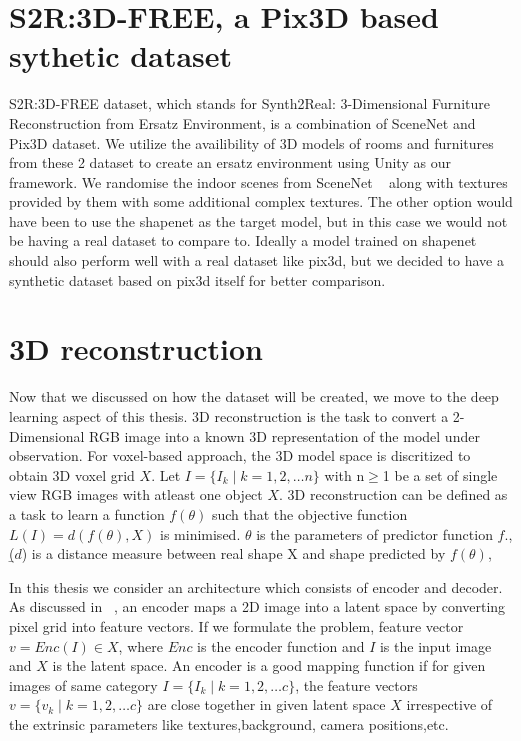 \section{S2R:3D-FREE, a Pix3D based sythetic dataset}\label{sec:s2r:3d-free-a-pix3d-based-sythetic-dataset}

S2R:3D-FREE dataset, which stands for Synth2Real: 3-Dimensional Furniture Reconstruction from Ersatz Environment, is a combination of SceneNet and Pix3D dataset.
We utilize the availibility of 3D models of rooms and furnitures from these 2 dataset to create an ersatz environment using Unity as our framework.
We randomise the indoor scenes from SceneNet ~\cite{McCormac:etal:ICCV2017} along with textures provided by them with some additional complex textures.
The other option would have been to use the shapenet as the target model, but in this case we would not be having a real dataset to compare to.
Ideally a model trained on shapenet should also perform well with a real dataset like pix3d, but we decided to have a synthetic dataset based on pix3d itself for better comparison.

\section{3D reconstruction}\label{sec:3D reconstruction}
Now that we discussed on how the dataset will be created, we move to the deep learning aspect of this thesis.
3D reconstruction is the task to convert a 2-Dimensional RGB image into a known 3D representation of the model under observation.
For voxel-based approach, the 3D model space is discritized to obtain 3D voxel grid $X$.
Let $I = \{I_k \mid k = 1,2,\dots n\}$ with n$\geq$1 be a set of single view RGB images with atleast one object $X$.
3D reconstruction can be defined as a task to learn a function $f(\theta)$ such that the objective function $L(I) = d(f(\theta),X)$ is minimised.
$\theta$ is the parameters of predictor function $f$., \b($d$) is a distance measure between real shape X and shape predicted by $f(\theta)$,

In this thesis we consider an architecture which consists of encoder and decoder.
As discussed in ~\cite{Han2021ImageBased3O}, an encoder maps a 2D image into a latent space by converting pixel grid into feature vectors.
If we formulate the problem, feature vector $v= Enc(I) \in X$, where $Enc$ is the encoder function and $I$ is the input image and $X$ is the latent space.
An encoder is a good mapping function if for given images of same category $I = \{I_k \mid k = 1,2,\dots c\}$, the feature vectors $v = \{v_k \mid k = 1,2,\dots c\}$ are close together in given latent space $X$
irrespective of the extrinsic parameters like textures,background, camera positions,etc.

